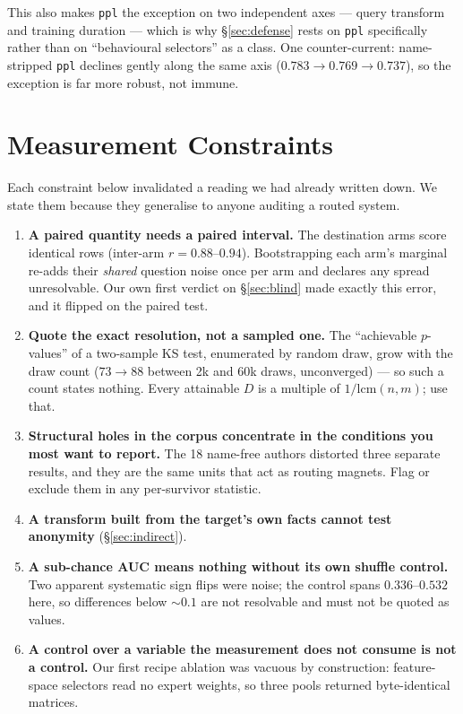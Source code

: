 \documentclass[11pt]{article}
\begin{document}
This also makes \texttt{ppl} the exception on two independent axes --- query transform and training
duration --- which is why \S\ref{sec:defense} rests on \texttt{ppl} specifically rather than on
``behavioural selectors'' as a class. One counter-current: name-stripped \texttt{ppl} declines
gently along the same axis ($0.783 \to 0.769 \to 0.737$), so the exception is far more robust, not
immune.

\section{Measurement Constraints}
\label{sec:method}

Each constraint below invalidated a reading we had already written down. We state them because they
generalise to anyone auditing a routed system.

\begin{enumerate}
  \item \textbf{A paired quantity needs a paired interval.} The destination arms score identical
        rows (inter-arm $r = 0.88$--$0.94$). Bootstrapping each arm's marginal re-adds their
        \emph{shared} question noise once per arm and declares any spread unresolvable. Our own
        first verdict on \S\ref{sec:blind} made exactly this error, and it flipped on the paired
        test.
  \item \textbf{Quote the exact resolution, not a sampled one.} The ``achievable $p$-values'' of a
        two-sample KS test, enumerated by random draw, grow with the draw count ($73 \to 88$ between
        2k and 60k draws, unconverged) --- so such a count states nothing. Every attainable $D$ is a
        multiple of $1/\mathrm{lcm}(n,m)$; use that.
  \item \textbf{Structural holes in the corpus concentrate in the conditions you most want to
        report.} The 18 name-free authors distorted three separate results, and they are the same
        units that act as routing magnets. Flag or exclude them in any per-survivor statistic.
  \item \textbf{A transform built from the target's own facts cannot test anonymity}
        (\S\ref{sec:indirect}).
  \item \textbf{A sub-chance AUC means nothing without its own shuffle control.} Two apparent
        systematic sign flips were noise; the control spans $0.336$--$0.532$ here, so differences
        below ${\sim}0.1$ are not resolvable and must not be quoted as values.
  \item \textbf{A control over a variable the measurement does not consume is not a control.} Our
        first recipe ablation was vacuous by construction: feature-space selectors read no expert
        weights, so three pools returned byte-identical matrices.
\end{enumerate}
\end{document}

